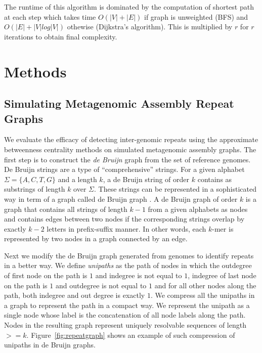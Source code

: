 \documentclass[runningheads,a4paper]{llncs}
\begin{document}
The runtime of this algorithm is dominated by the computation of shortest path at each step which takes time $O(|V| + |E|)$ if graph is unweighted (BFS) and $O(|E| + |V|log|V|)$ othewise (Dijkstra's algorithm). This is multiplied by $r$ for $r$ iterations to obtain final complexity.


\section{Methods}


\subsection*{Simulating Metagenomic Assembly Repeat Graphs}

We evaluate the efficacy of detecting inter-genomic repeats using the approximate betweenness centrality methods on simulated metagenomic assembly graphs.
The first step is to construct the \textit{de Bruijn} graph from the set of reference genomes.
De Bruijn strings are a type of ``comprehensive'' strings. For a given alphabet $\Sigma = \{A,C,T,G\}$ and a length $k$, a de Bruijn string of order $k$ contains as substrings of length $k$ over $\Sigma$. These strings can be represented in a sophisticated way in term of a graph called de Bruijn graph \cite{debruijn}. A de Bruijn graph of order $k$ is a graph that contains all strings of length $k-1$ from a given alphabets as nodes and contains edges between two nodes if the corresponding strings overlap by exactly $k-2$ letters in prefix-suffix manner. In other words, each $k$-mer is represented by two nodes in a graph connected by an edge. 

Next we modify the de Bruijn graph generated from genomes to identify repeats in a better way. We define \textit{unipaths} as the path of nodes in which the outdegree of first node on the path is $1$ and indegree is not equal to $1$, indegree of last node on the path is $1$ and outdegree is not equal to $1$ and for all other nodes along the path, both indegree and out degree is exactly $1$. We compress all the unipaths in a graph to represent the path in a compact way. We represent the unipath as a single node whose label is the concatenation of all node labels along the path.
Nodes in the resulting graph represent uniquely resolvable sequences of length $>= k$.
Figure~\ref{fig:repeatgraph} shows an example of such compression of unipaths in de Bruijn graphs.
\end{document}
